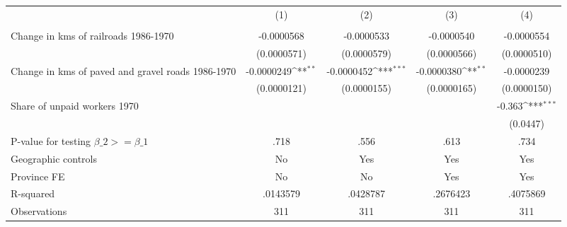 {
\def\sym#1{\ifmmode^{#1}\else\(^{#1}\)\fi}
\begin{tabular}{l*{4}{c}}
\hline\hline
                &\multicolumn{1}{c}{(1)}&\multicolumn{1}{c}{(2)}&\multicolumn{1}{c}{(3)}&\multicolumn{1}{c}{(4)}\\
                &\multicolumn{1}{c}{}&\multicolumn{1}{c}{}&\multicolumn{1}{c}{}&\multicolumn{1}{c}{}\\
\hline
Change in kms of railroads 1986-1970&-0.0000568         &-0.0000533         &-0.0000540         &-0.0000554         \\
                &(0.0000571)         &(0.0000579)         &(0.0000566)         &(0.0000510)         \\
[1em]
Change in kms of paved and gravel roads 1986-1970&-0.0000249\sym{**} &-0.0000452\sym{***}&-0.0000380\sym{**} &-0.0000239         \\
                &(0.0000121)         &(0.0000155)         &(0.0000165)         &(0.0000150)         \\
[1em]
Share of unpaid workers 1970&                  &                  &                  &   -0.363\sym{***}\\
                &                  &                  &                  & (0.0447)         \\
\hline
P-value for testing $\beta\_{2} >= \beta\_{1}$&     .718         &     .556         &     .613         &     .734         \\
Geographic controls&       No         &      Yes         &      Yes         &      Yes         \\
Province FE     &       No         &       No         &      Yes         &      Yes         \\
R-squared       & .0143579         & .0428787         & .2676423         & .4075869         \\
Observations    &      311         &      311         &      311         &      311         \\
\hline\hline
\end{tabular}
}
